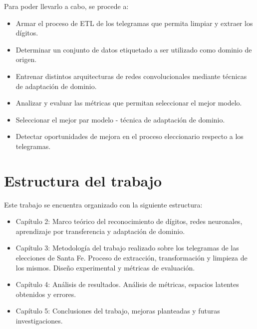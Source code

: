 Para poder llevarlo a cabo, se procede a:
\begin{itemize}
    \item Armar el proceso de ETL de los telegramas que permita limpiar y extraer los d\'igitos.
    \item Determinar un conjunto de datos etiquetado a ser utilizado como dominio de origen.
    \item Entrenar distintos arquitecturas de redes convolucionales mediante t\'ecnicas de adaptaci\'on de dominio.
    \item Analizar y evaluar las m\'etricas que permitan seleccionar el mejor modelo.
    \item Seleccionar el mejor par modelo - t\'ecnica de adaptación de dominio.
    \item Detectar oportunidades de mejora en el proceso eleccionario respecto a los telegramas.
\end{itemize}

\section{Estructura del trabajo}
Este trabajo se encuentra organizado con la siguiente estructura:

\begin{itemize}
    \item Capítulo 2: Marco teórico del reconocimiento de dígitos, redes neuronales, aprendizaje por transferencia y adaptación
          de dominio.
    \item Capítulo 3: Metodología del trabajo realizado sobre los telegramas de las elecciones de Santa Fe. Proceso de
          extracción, transformación y limpieza de los mismos. Diseño experimental y métricas de evaluación.
    \item Capítulo 4: Análisis de resultados. Análisis de métricas, espacios latentes obtenidos y errores.
    \item Capítulo 5: Conclusiones del trabajo, mejoras planteadas y futuras investigaciones.
\end{itemize}